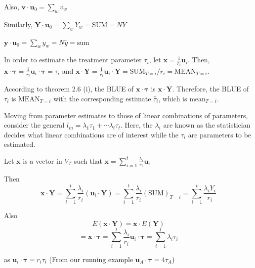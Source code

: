 \documentclass[12pt, oneside]{article}
\begin{document}
Also, $\mathbf{v} \cdot \mathbf{u}_0 = \sum_w v_w$

Similarly, $\mathbf{Y} \cdot \mathbf{u}_0 = \sum_w Y_w = \text{SUM} = N\bar{Y}$

$\mathbf{y} \cdot \mathbf{u}_0 = \sum_w y_w = N\bar{y} = \text{sum}$

In order to estimate the treatment parameter $\tau_i$, let $\mathbf{x} = \frac{1}{r_i} \mathbf{u}_i$.
Then, $\mathbf{x} \cdot \boldsymbol{\tau} = \frac{1}{r_i} \mathbf{u}_i \cdot \boldsymbol{\tau} = \tau_i$
and $\mathbf{x} \cdot \mathbf{Y} = \frac{1}{r_i} \mathbf{u}_i \cdot \mathbf{Y} = \text{SUM}_{T=i}/r_i = \text{MEAN}_{T=i}$.

According to theorem 2.6 (i), the BLUE of $\mathbf{x} \cdot \boldsymbol{\tau}$ is $\mathbf{x} \cdot \mathbf{Y}$. 
Therefore, the BLUE of $\tau_i$ is $\text{MEAN}_{T=i}$ with the corresponding estimate $\hat{\tau}_i$, which is 
$\text{mean}_{T=i}$.

Moving from parameter estimates to those of linear combinations of parameters, consider the general 
$l_{m} = \lambda_{1} \tau_{1} + \cdots \lambda_{t} \tau_{t}$. Here, the $\lambda_{i}$ are known as the statistician decides what
linear combinations are of interest while the $\tau_{i}$ are parameters to be estimated. 


Let $\mathbf{x}$ is a vector in $V_T$ such that $\mathbf{x} = \sum_{i=1}^t \frac{\lambda_i}{r_i} \mathbf{u}_i$

Then
\[
\mathbf{x} \cdot \mathbf{Y} = \sum_{i=1}^t \frac{\lambda_i}{r_i} (\mathbf{u}_i \cdot \mathbf{Y})
= \sum_{i=1}^t \frac{\lambda_i}{r_i} (\text{SUM})_{T=i} = \sum_{i=1}^t \frac{\lambda_i Y_i}{r_i}
\]

Also
\[
E(\mathbf{x} \cdot \mathbf{Y}) = \mathbf{x} \cdot E(\mathbf{Y})
\]
\[
= \mathbf{x} \cdot \boldsymbol{\tau} = \sum_{i=1}^t \frac{\lambda_i}{r_i} \mathbf{u}_i \cdot \boldsymbol{\tau} = \sum_{i=1}^t \lambda_i \tau_i
\]

as $\mathbf{u}_i \cdot \boldsymbol{\tau} = r_i \tau_i$ (From our running example $\mathbf{u}_A \cdot \boldsymbol{\tau} = 4\tau_A$)
\end{document}
